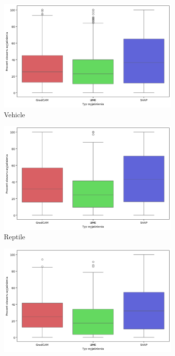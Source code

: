 \begin{figure}[h]
	\begin{subfigure}[b]{0.3\textwidth}
		\centering\includegraphics[width=.9\textwidth]{img/areaincorrect_vehicle}
		\caption{Vehicle}
	\end{subfigure}
	\begin{subfigure}[b]{0.3\textwidth}
		\centering\includegraphics[width=.9\textwidth]{img/areaincorrect_reptile}
		\caption{Reptile}
	\end{subfigure}
	\begin{subfigure}[b]{0.3\textwidth}
		\centering\includegraphics[width=.9\textwidth]{img/areaincorrect_carnivore}

\end{subfigure}
\end{figure}
